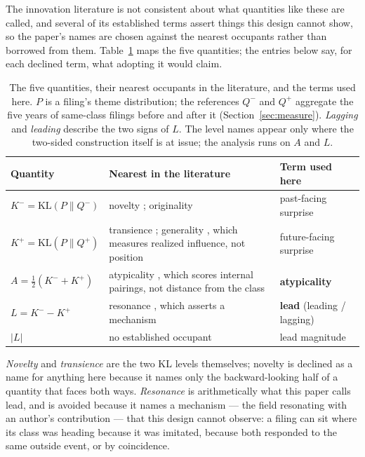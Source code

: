 The innovation literature is not consistent about what quantities like
these are called, and several of its established terms assert things this
design cannot show, so the paper's names are chosen against the nearest
occupants rather than borrowed from them. Table~\ref{tab:nomenclature}
maps the five quantities; the entries below say, for each declined term,
what adopting it would claim.

\begin{table}[!htbp]\centering\small
\caption{The five quantities, their nearest occupants in the literature,
and the terms used here. $P$ is a filing's theme distribution;
the references $Q^{-}$ and $Q^{+}$ aggregate the five years of
same-class filings before and after it (Section~\ref{sec:measure}).
\emph{Lagging} and \emph{leading} describe the two signs of $L$. The
level names appear only where the two-sided construction itself is at
issue; the analysis runs on $A$ and $L$.}
\label{tab:nomenclature}
\begin{tabular}{p{3.4cm}p{5.6cm}p{4.4cm}}
\toprule
Quantity & Nearest in the literature & Term used here \\
\midrule
$K^{-} = \mathrm{KL}(P \| Q^{-})$ & novelty \citep{Murdock2017, Barron2018}; originality \citep{HallJaffe2001} & past-facing surprise \\
$K^{+} = \mathrm{KL}(P \| Q^{+})$ & transience \citep{Murdock2017}; generality \citep{HallJaffe2001}, which measures realized influence, not position & future-facing surprise \\
$A = \tfrac{1}{2}(K^{-} + K^{+})$ & atypicality \citep{Uzzi2013}, which scores internal pairings, not distance from the class & \textbf{atypicality} \\
$L = K^{-} - K^{+}$ & resonance \citep{Barron2018}, which asserts a mechanism & \textbf{lead} (leading / lagging) \\
$|L|$ & no established occupant & lead magnitude \\
\bottomrule
\end{tabular}
\end{table}

\emph{Novelty} and \emph{transience} are the two KL levels themselves;
novelty is declined as a name for anything here because it names only the
backward-looking half of a quantity that faces both ways.
\emph{Resonance} is arithmetically what this paper calls lead, and is
avoided because it names a mechanism --- the field resonating with an
author's contribution --- that this design cannot observe: a filing can
sit where its class was heading because it was imitated, because both
responded to the same outside event, or by coincidence.

